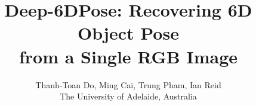 \documentclass[conference]{IEEEtran}
\newcommand{\method}[1]{Deep-6DPose}
\begin{document}
\title{\method{}: Recovering 6D Object Pose \\from a Single RGB Image}
\author{Thanh-Toan Do, Ming Cai, Trung Pham, Ian Reid\\
The University of Adelaide, Australia}





% 
\end{document}
